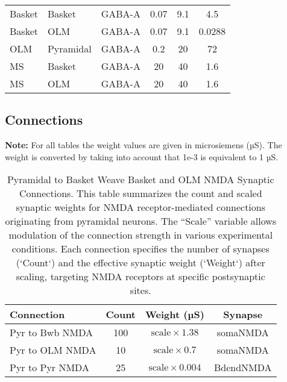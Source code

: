 \begin{table}[htbp]
\begin{tabular}{lllccc}
        Basket               & Basket                & GABA-A            & 0.07                     & 9.1                      & 4.5                       \\
        Basket               & OLM                   & GABA-A            & 0.07                     & 9.1                      & 0.0288                    \\
        OLM                  & Pyramidal             & GABA-A            & 0.2                      & 20                       & 72                        \\
        MS                   & Basket                & GABA-A            & 20                       & 40                       & 1.6                       \\
        MS                   & OLM                   & GABA-A            & 20                       & 40                       & 1.6                       \\
        \hline
    \end{tabular}
\end{table}\pagebreak
\subsection{Connections}
\textbf{Note:} For all tables the weight values are given in microsiemens (µS).
The weight is converted by taking into account that 1e-3 is equivalent to 1 µS.
\begin{table}[htbp]
    \centering
    \caption[Pyr to Other Cells NMDA Connections Summary]{Pyramidal to Basket Weave Basket and OLM NMDA Synaptic Connections. This table summarizes the count and scaled synaptic weights for NMDA receptor-mediated connections originating from pyramidal neurons. The ``Scale'' variable allows modulation of the connection strength in various experimental conditions. Each connection specifies the number of synapses (`Count`) and the effective synaptic weight (`Weight`) after scaling, targeting NMDA receptors at specific postsynaptic sites.}\label{tab:pyr_nmda_connections}
    \begin{tabular}{lccc}
        \hline
        \textbf{Connection} & \textbf{Count} & \textbf{Weight (µS)}            & \textbf{Synapse} \\
        \hline
        Pyr to Bwb NMDA     & 100            & \( \text{scale} \times 1.38 \)  & somaNMDA         \\
        Pyr to OLM NMDA     & 10             & \( \text{scale} \times 0.7 \)   & somaNMDA         \\
        Pyr to Pyr NMDA     & 25             & \( \text{scale} \times 0.004 \) & BdendNMDA        \\
        \hline
    \end{tabular}
\end{table}


